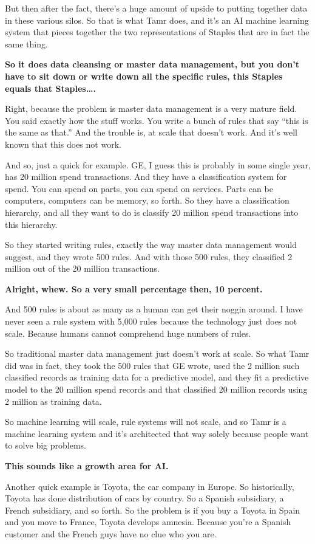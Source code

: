 \documentclass[a4paper,12pt,notitlepage,twoside,openright]{article}
\begin{document}
But then after the fact, there's a huge amount of upside to putting
together data in these various silos. So that is what Tamr does, and
it's an AI machine learning system that pieces together the two
representations of Staples that are in fact the same thing.

\textbf{So it does data cleansing or master data management, but you
don't have to sit down or write down all the specific rules, this
Staples equals that Staples\ldots{}.}

Right, because the problem is master data management is a very mature
field. You said exactly how the stuff works. You write a bunch of rules
that say ``this is the same as that.'' And the trouble is, at scale that
doesn't work. And it's well known that this does not work.

And so, just a quick for example. GE, I guess this is probably in some
single year, has 20 million spend transactions. And they have a
classification system for spend. You can spend on parts, you can spend
on services. Parts can be computers, computers can be memory, so forth.
So they have a classification hierarchy, and all they want to do is
classify 20 million spend transactions into this hierarchy.

So they started writing rules, exactly the way master data management
would suggest, and they wrote 500 rules. And with those 500 rules, they
classified 2 million out of the 20 million transactions.

\textbf{Alright, whew. So a very small percentage then, 10 percent.}

And 500 rules is about as many as a human can get their noggin around. I
have never seen a rule system with 5,000 rules because the technology
just does not scale. Because humans cannot comprehend huge numbers of
rules.

So traditional master data management just doesn't work at scale. So
what Tamr did was in fact, they took the 500 rules that GE wrote, used
the 2 million such classified records as training data for a predictive
model, and they fit a predictive model to the 20 million spend records
and that classified 20 million records using 2 million as training data.

So machine learning will scale, rule systems will not scale, and so Tamr
is a machine learning system and it's architected that way solely
because people want to solve big problems.

\textbf{This sounds like a growth area for AI.}

Another quick example is Toyota, the car company in Europe. So
historically, Toyota has done distribution of cars by country. So a
Spanish subsidiary, a French subsidiary, and so forth. So the problem is
if you buy a Toyota in Spain and you move to France, Toyota develops
amnesia. Because you're a Spanish customer and the French guys have no
clue who you are.
\end{document}
